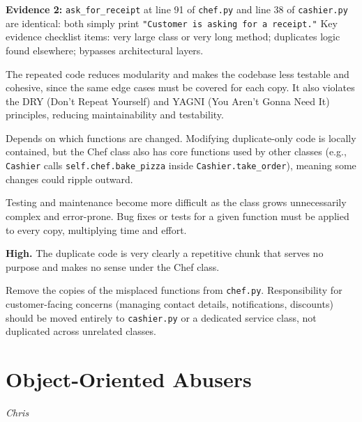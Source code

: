 \documentclass[12pt]{article}
\begin{document}
\begin{description}
        \textbf{Evidence 2:} \texttt{ask\_for\_receipt} at line 91 of \texttt{chef.py} and
        line 38 of \texttt{cashier.py} are identical: both simply print
        \texttt{"Customer is asking for a receipt."} Key evidence checklist items: very large class
        or very long method; duplicates logic found elsewhere; bypasses architectural layers.

    \item[Why is this risky?]
        The repeated code reduces modularity and makes the codebase less testable and cohesive,
        since the same edge cases must be covered for each copy. It also violates the DRY
        (Don't Repeat Yourself) and YAGNI (You Aren't Gonna Need It) principles, reducing
        maintainability and testability.

    \item[Estimated Change Radius]
        Depends on which functions are changed. Modifying duplicate-only code is locally contained,
        but the Chef class also has core functions used by other classes (e.g., \texttt{Cashier}
        calls \texttt{self.chef.bake\_pizza} inside \texttt{Cashier.take\_order}), meaning some
        changes could ripple outward.

    \item[Impact]
        Testing and maintenance become more difficult as the class grows unnecessarily complex and
        error-prone. Bug fixes or tests for a given function must be applied to every copy, multiplying
        time and effort.

    \item[Confidence Level]
        \textbf{High.} The duplicate code is very clearly a repetitive chunk that serves no purpose
        and makes no sense under the Chef class.

    \item[Suggested Refactor]
        Remove the copies of the misplaced functions from \texttt{chef.py}. Responsibility for
        customer-facing concerns (managing contact details, notifications, discounts) should be
        moved entirely to \texttt{cashier.py} or a dedicated service class, not duplicated across
        unrelated classes.
\end{description}

\section{Object-Oriented Abusers}

\textit{Chris}
\end{document}
